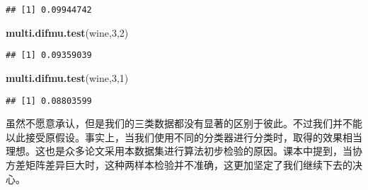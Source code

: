 \documentclass[]{article}
\newenvironment{Shaded}{\begin{snugshade}}{\end{snugshade}}
\newcommand{\DataTypeTok}[1]{\textcolor[rgb]{0.13,0.29,0.53}{#1}}
\newcommand{\DecValTok}[1]{\textcolor[rgb]{0.00,0.00,0.81}{#1}}
\newcommand{\KeywordTok}[1]{\textcolor[rgb]{0.13,0.29,0.53}{\textbf{#1}}}
\newcommand{\NormalTok}[1]{#1}
\newcommand{\OperatorTok}[1]{\textcolor[rgb]{0.81,0.36,0.00}{\textbf{#1}}}
\begin{document}
\begin{Shaded}
\end{Shaded}

\begin{verbatim}
## [1] 0.09944742
\end{verbatim}

\begin{Shaded}
\begin{Highlighting}[]
\KeywordTok{multi.difmu.test}\NormalTok{(wine,}\DecValTok{3}\NormalTok{,}\DecValTok{2}\NormalTok{)}
\end{Highlighting}
\end{Shaded}

\begin{verbatim}
## [1] 0.09359039
\end{verbatim}

\begin{Shaded}
\begin{Highlighting}[]
\KeywordTok{multi.difmu.test}\NormalTok{(wine,}\DecValTok{3}\NormalTok{,}\DecValTok{1}\NormalTok{)}
\end{Highlighting}
\end{Shaded}

\begin{verbatim}
## [1] 0.08803599
\end{verbatim}

虽然不愿意承认，但是我们的三类数据都没有显著的区别于彼此。不过我们并不能以此接受原假设。事实上，当我们使用不同的分类器进行分类时，取得的效果相当理想。这也是众多论文采用本数据集进行算法初步检验的原因。课本中提到，当协方差矩阵差异巨大时，这种两样本检验并不准确，这更加坚定了我们继续下去的决心。
\end{document}
